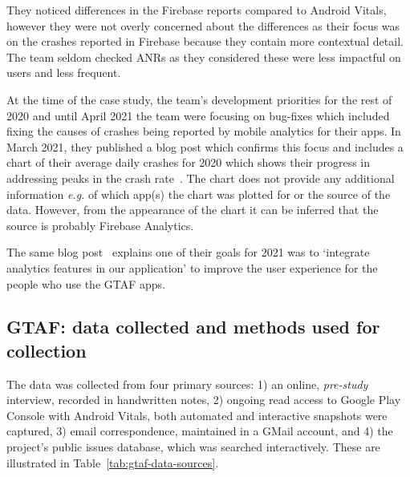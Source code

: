 They noticed differences in the Firebase reports compared to Android Vitals, however they were not overly concerned about the differences as their focus was on the crashes reported in Firebase because they contain more contextual detail. The team seldom checked ANRs as they considered these were less impactful on users and less frequent. %

At the time of the case study, the team's development priorities for the rest of 2020 and until April 2021 the team were focusing on bug-fixes which included fixing the causes of crashes being reported by mobile analytics for their apps. In March 2021, they published a blog post which confirms this focus and includes a chart of their average daily crashes for 2020 which shows their progress in addressing peaks in the crash rate~\citep{gtafblog2021_gtaf_accomplishment_2020}. The chart does not provide any additional information \emph{e.g.} of which app(s) the chart was plotted for or the source of the data. However, from the appearance of the chart it can be inferred that the source is probably Firebase Analytics.

The same blog post~\citep{gtafblog2021_gtaf_accomplishment_2020} explains one of their goals for 2021 was to `integrate analytics features in our application' to improve the user experience for the people who use the GTAF apps.

\subsection{GTAF: data collected and methods used for collection}
The data was collected from four primary sources: 1) an online, \textit{pre-study} interview, recorded in handwritten notes, 2) ongoing read access to Google Play Console with Android Vitals, both automated and interactive snapshots were captured, 3) email correspondence, maintained in a GMail account, and 4) the project's public issues database, which was searched interactively. These are illustrated in Table~\ref{tab:gtaf-data-sources}.


